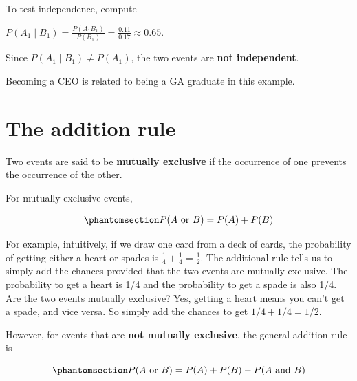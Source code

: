 \documentclass[
  letterpaper,
  DIV=11,
  numbers=noendperiod]{scrreprt}
\begin{document}
To test independence, compute

\(P(A_1 \mid B_1) = \displaystyle \frac{P(A_1 B_1)}{P(B_1)} = \displaystyle \frac{0.11}{0.17} \approx 0.65\).

Since \(P(A_1 \mid B_1) \neq P(A_1)\), the two events are \textbf{not
independent}.

\begin{tcolorbox}[enhanced jigsaw, coltitle=black, colbacktitle=quarto-callout-tip-color!10!white, left=2mm, bottomrule=.15mm, bottomtitle=1mm, colback=white, titlerule=0mm, colframe=quarto-callout-tip-color-frame, breakable, leftrule=.75mm, toptitle=1mm, opacitybacktitle=0.6, rightrule=.15mm, title=\textcolor{quarto-callout-tip-color}{\faLightbulb}\hspace{0.5em}{Interpretation}, arc=.35mm, opacityback=0, toprule=.15mm]

Becoming a CEO is related to being a GA graduate in this example.

\end{tcolorbox}

\section{The addition rule}\label{the-addition-rule}

Two events are said to be \textbf{mutually exclusive} if the occurrence
of one prevents the occurrence of the other.

For mutually exclusive events,

\begin{equation}\phantomsection\label{eq-additional-rule-mutually-exclusive}{
P(A \text{ or } B) = P(A) + P(B)
}\end{equation}

For example, intuitively, if we draw one card from a deck of cards, the
probability of getting either a heart or spades is
\(\frac{1}{4} + \frac{1}{4} = \frac{1}{2}\). The additional rule tells
us to simply add the chances provided that the two events are mutually
exclusive. The probability to get a heart is 1/4 and the probability to
get a spade is also 1/4. Are the two events mutually exclusive? Yes,
getting a heart means you can't get a spade, and vice versa. So simply
add the chances to get \(1/4 + 1/4 = 1/2.\)

However, for events that are \textbf{not mutually exclusive}, the
general addition rule is

\begin{equation}\phantomsection\label{eq-additional-rule}{
P(A \text{ or } B) = P(A) + P(B) - P(A \text{ and } B)
}\end{equation}
\end{document}
